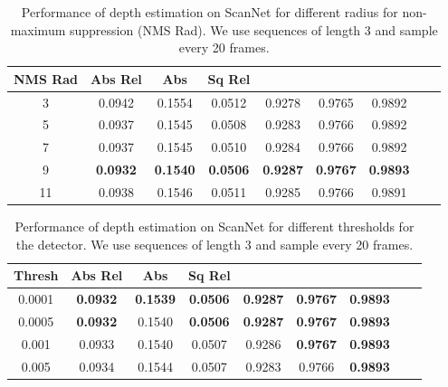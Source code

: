 \documentclass[runningheads]{llncs}
\begin{document}
\begin{table}[h]
  \caption{Performance of depth estimation on ScanNet for different radius for non-maximum suppression (NMS Rad). We use sequences of length 3 and sample every 20 frames. }
  \centering
\begin{tabular}{ccccccccc}
 \hline 
   NMS Rad  &Abs Rel  &Abs & Sq Rel & \textbf{}& \textbf{}& \textbf{}\\
    \hline
3 &	0.0942&	0.1554&	0.0512&	0.9278&	0.9765&	0.9892\\
5 & 0.0937&	0.1545&	0.0508&	0.9283&	0.9766&	0.9892\\
7 &0.0937&	0.1545&	0.0510&	0.9284&	0.9766&	0.9892\\
9 &	\textbf{0.0932} & \textbf{0.1540} & \textbf{0.0506} &  \textbf{0.9287} & \textbf{0.9767} & \textbf{0.9893} \\
11 &0.0938& 0.1546&	0.0511&	0.9285&	0.9766&	0.9891\\
\hline
  \end{tabular}
\label{tablenms}
\end{table}




\begin{table}[h]
  \caption{Performance of depth estimation on ScanNet for different thresholds for the detector. We use sequences of length 3 and sample every 20 frames. }
  \centering
\begin{tabular}{ccccccccc}
 \hline 
   Thresh  &Abs Rel  &Abs & Sq Rel & \textbf{}& \textbf{}& \textbf{}\\
    \hline
0.0001 & \textbf{0.0932} & \textbf{0.1539} & \textbf{0.0506} &  \textbf{0.9287} & \textbf{0.9767} & \textbf{0.9893} \\
0.0005 & \textbf{0.0932} & 0.1540 & \textbf{0.0506} &  \textbf{0.9287} & \textbf{0.9767} & \textbf{0.9893} \\
0.001 &0.0933&	0.1540&	0.0507&	0.9286&	\textbf{0.9767}&	\textbf{0.9893}\\
0.005 & 0.0934&	0.1544&	0.0507&	0.9283&	0.9766&	\textbf{0.9893}\\

\hline
  \end{tabular}
\label{tablethresh}
\end{table}
\end{document}
